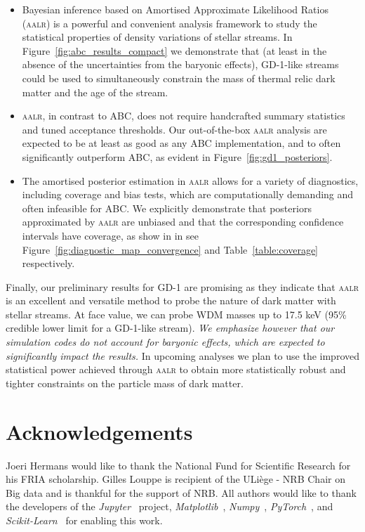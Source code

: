 \documentclass[fleqn,usenatbib]{mnras}
\begin{document}
\begin{itemize}
    \item Bayesian inference based on Amortised Approximate Likelihood Ratios (\textsc{aalr}) is a powerful and convenient analysis framework to study the statistical properties of density variations of stellar streams. In Figure~\ref{fig:abc_results_compact} we demonstrate that (at least in the absence of the uncertainties from the baryonic effects), GD-1-like streams could be used to simultaneously constrain the mass of thermal relic dark matter and the age of the stream. 
    
    \item \textsc{aalr}, in contrast to ABC, does not require handcrafted summary statistics and tuned acceptance thresholds. Our out-of-the-box \textsc{aalr} analysis are expected to be at least as good as any ABC implementation, and to often significantly outperform ABC, as evident in Figure~\ref{fig:gd1_posteriors}. 
    \item The amortised posterior estimation in \textsc{aalr} allows for a variety of diagnostics, including coverage and bias tests, which are computationally demanding and often infeasible for ABC. We explicitly demonstrate that posteriors approximated by \textsc{aalr} are unbiased and that the corresponding confidence intervals have coverage, as show in in see Figure~\ref{fig:diagnostic_map_convergence} and Table~\ref{table:coverage} respectively.
\end{itemize}

\bigskip

Finally, our preliminary results for GD-1 are promising as they indicate that \textsc{aalr} is an excellent and versatile method to probe the nature of dark matter with stellar streams. At face value, we can probe WDM masses up to 17.5 keV (95\% credible lower limit for a GD-1-like stream).  \emph{We emphasize however that our simulation codes do not account for baryonic effects, which are expected to significantly impact the results.}  In upcoming analyses we plan to use the improved statistical power achieved through \textsc{aalr} to obtain more statistically robust and tighter constraints on the particle mass of dark matter.

\section*{Acknowledgements}
Joeri Hermans would like to thank the National Fund for Scientific Research for his FRIA scholarship.
Gilles Louppe is recipient of the ULiège - NRB Chair on Big data and is thankful for the support of NRB.
All authors would like to thank the developers of the \emph{Jupyter}~\citep{jupyter} project, \emph{Matplotlib}~\citep{matplotlib},
\emph{Numpy}~\citep{numpy}, \emph{PyTorch}~\citep{paszke2017automatic},
and \emph{Scikit-Learn}~\citep{scikit-learn} for enabling this work.
\end{document}
